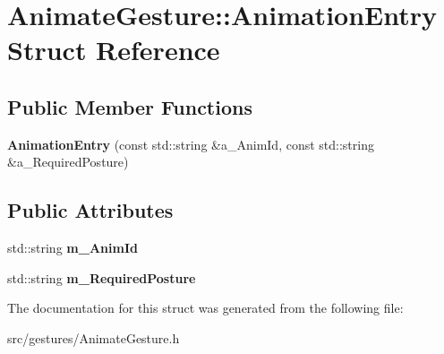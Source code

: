 \hypertarget{struct_animate_gesture_1_1_animation_entry}{}\section{Animate\+Gesture\+:\+:Animation\+Entry Struct Reference}
\label{struct_animate_gesture_1_1_animation_entry}
\subsection*{Public Member Functions}
\begin{DoxyCompactItemize}
\item 
\mbox{\label{struct_animate_gesture_1_1_animation_entry_a0315c5c9ed0bdd3da84c7afd6bd598c1}} 
{\bfseries Animation\+Entry} (const std\+::string \&a\+\_\+\+Anim\+Id, const std\+::string \&a\+\_\+\+Required\+Posture)
\end{DoxyCompactItemize}
\subsection*{Public Attributes}
\begin{DoxyCompactItemize}
\item 
\mbox{\label{struct_animate_gesture_1_1_animation_entry_a432fcd2ba2ae1e09649f6b911e0d9672}} 
std\+::string {\bfseries m\+\_\+\+Anim\+Id}
\item 
\mbox{\label{struct_animate_gesture_1_1_animation_entry_a0aa2dfc297cb7dff927f395c01351a51}} 
std\+::string {\bfseries m\+\_\+\+Required\+Posture}
\end{DoxyCompactItemize}


The documentation for this struct was generated from the following file\+:\begin{DoxyCompactItemize}
\item 
src/gestures/Animate\+Gesture.\+h\end{DoxyCompactItemize}
